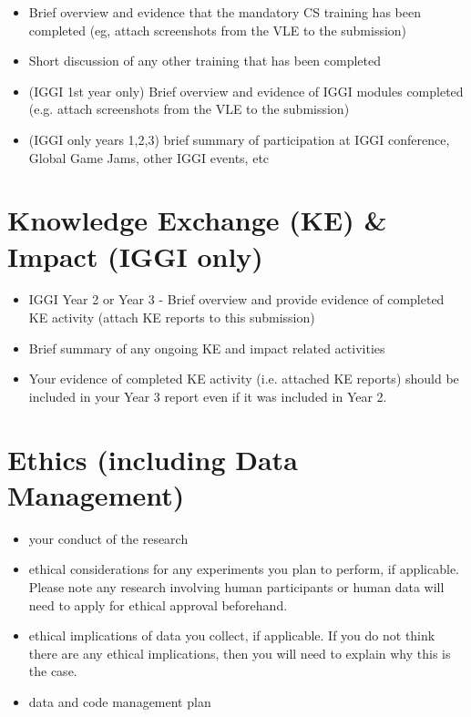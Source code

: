 \documentclass[11pt,a4paper]{article}
\begin{document}
\begin{itemize}
    \item Brief overview and evidence that the mandatory CS training has been completed (eg, attach screenshots from the VLE to the submission)
    \item Short discussion of any other training that has been completed
    \item (IGGI 1st year only) Brief overview and evidence of IGGI modules completed (e.g. attach screenshots from the VLE to the submission)
    \item (IGGI only years 1,2,3) brief summary of participation at IGGI conference, Global Game Jams, other IGGI events, etc 
\end{itemize}

\section{Knowledge Exchange (KE) \& Impact (IGGI only)}
\begin{itemize}
    \item IGGI Year 2 or Year 3 - Brief overview and provide evidence of completed KE activity (attach KE reports to this submission)
    \item Brief summary of any ongoing KE and impact related activities
    \item Your evidence of completed KE activity (i.e. attached KE reports) should be included in your Year 3 report even if it was included in Year 2. 
\end{itemize}

\section{Ethics (including Data Management)}
\begin{itemize}
    \item your conduct of the research 
    \item ethical considerations for  any experiments you plan to perform, if applicable. Please note any research involving human participants or human data will need to apply for ethical approval beforehand. 
    \item ethical implications of data you collect, if applicable. If you do not think there are any ethical implications, then you will need to explain why this is the case. 
    \item data and code management plan 
\end{itemize}
\end{document}
